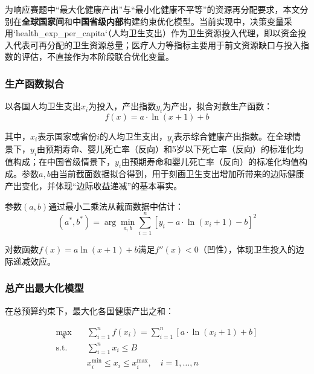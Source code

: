 \documentclass[12pt,a4paper]{ctexart}
\begin{document}
为响应赛题中“最大化健康产出”与“最小化健康不平等”的资源再分配要求，本文分别在\textbf{全球国家间}和\textbf{中国省级内部}构建约束优化模型。当前实现中，决策变量采用`health\_exp\_per\_capita`（人均卫生支出）作为卫生资源投入代理，即以资金投入代表可再分配的卫生资源总量；医疗人力等指标主要用于前文资源缺口与投入指数的评估，不直接作为本阶段联合优化变量。

\subsubsection{生产函数拟合}

以各国人均卫生支出$x_i$为投入，产出指数$y_i$为产出，拟合对数生产函数：
\begin{equation}
\label{eq:production}
    f(x) = a \cdot \ln(x + 1) + b
\end{equation}

其中，$x_i$表示国家或省份$i$的人均卫生支出，$y_i$表示综合健康产出指数。在全球情景下，$y_i$由预期寿命、婴儿死亡率（反向）和5岁以下死亡率（反向）的标准化均值构成；在中国省级情景下，$y_i$由预期寿命和婴儿死亡率（反向）的标准化均值构成。参数$a,b$由当前截面数据拟合得到，用于刻画卫生支出增加所带来的边际健康产出变化，并体现“边际收益递减”的基本事实。

参数$(a, b)$通过最小二乘法从截面数据中估计：
\begin{equation}
    (a^*, b^*) = \arg\min_{a, b} \sum_{i=1}^{n} \left[y_i - a \cdot \ln(x_i + 1) - b\right]^2
\end{equation}

对数函数$f(x) = a\ln(x+1) + b$满足$f''(x) < 0$（凹性），体现卫生投入的边际递减效应。

\subsubsection{总产出最大化模型}

在总预算约束下，最大化各国健康产出之和：

\begin{equation}
\label{eq:max-output}
\begin{aligned}
\max_{\mathbf{x}} \quad & \sum_{i=1}^{n} f(x_i) = \sum_{i=1}^{n} \left[a \cdot \ln(x_i + 1) + b\right] \\
\text{s.t.} \quad & \sum_{i=1}^{n} x_i \leq B \\
& x_i^{\text{min}} \leq x_i \leq x_i^{\text{max}}, \quad i = 1, \ldots, n
\end{aligned}
\end{equation}
\end{document}
